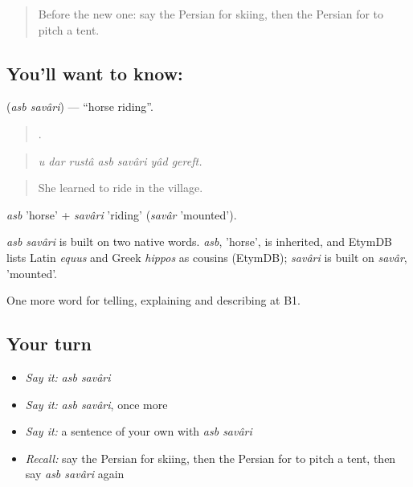 \label{lesson:FA-C511-asb-savari}



\begin{quote}
Before the new one: say the Persian for skiing, then the Persian for to pitch a tent.
\end{quote}

\subsection*{You'll want to know:  }
\textbf{ } (\emph{asb savâri}) — \textquotedblleft{}horse riding\textquotedblright{}.

\begin{quote}
      .
\end{quote}

\begin{quote}
\emph{u dar rustâ asb savâri yâd gereft.}
\end{quote}

\begin{quote}
She learned to ride in the village.
\end{quote}

\emph{asb} 'horse' + \emph{savâri} 'riding' (\emph{savâr} 'mounted').

\begin{cousinweb}
\emph{asb savâri} is built on two native words. \emph{asb}, 'horse', is inherited, and EtymDB lists Latin \emph{equus} and Greek \emph{hippos} as cousins (EtymDB); \emph{savâri} is built on \emph{savâr}, 'mounted'.
\end{cousinweb}

\begin{grammarlens}[title={What you've built}]
One more word for telling, explaining and describing at B1.
\end{grammarlens}

\subsection*{Your turn}
\begin{itemize}
\raggedright
  \item \emph{Say it:} \emph{asb savâri}
  \item \emph{Say it:} \emph{asb savâri}, once more
  \item \emph{Say it:} a sentence of your own with \emph{asb savâri}
  \item \emph{Recall:} say the Persian for skiing, then the Persian for to pitch a tent, then say \emph{asb savâri} again
\end{itemize}

